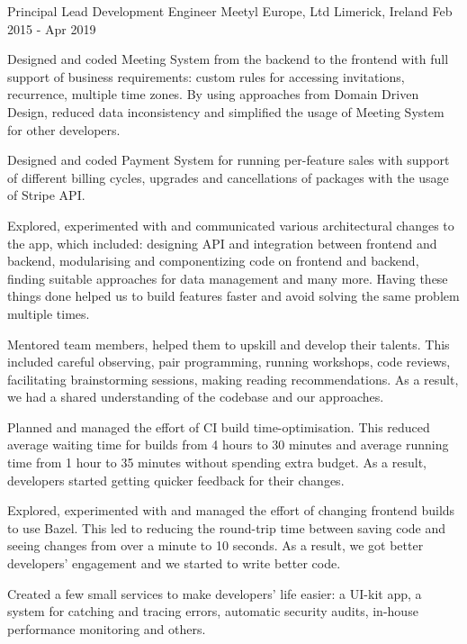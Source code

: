 

\begin{cventries}

  \cventry
    {Principal Lead Development Engineer} %
    {Meetyl Europe, Ltd} %
    {Limerick, Ireland} %
    {Feb 2015 - Apr 2019} %
    {
      \begin{cvitems} %
        \item {Designed and coded Meeting System from the backend to the frontend with full support of business requirements: custom rules for accessing invitations, recurrence, multiple time zones. By using approaches from Domain Driven Design, reduced data inconsistency and simplified the usage of Meeting System for other developers.}
        \item {Designed and coded Payment System for running per-feature sales with support of different billing cycles, upgrades and cancellations of packages with the usage of Stripe API.}
        \item {Explored, experimented with and communicated various architectural changes to the app, which included: designing API and integration between frontend and backend, modularising and componentizing code on frontend and backend, finding suitable approaches for data management and many more. Having these things done helped us to build features faster and avoid solving the same problem multiple times.}
        \item {Mentored team members, helped them to upskill and develop their talents. This included careful observing, pair programming, running workshops, code reviews, facilitating brainstorming sessions, making reading recommendations. As a result, we had a shared understanding of the codebase and our approaches.}
        \item {Planned and managed the effort of CI build time-optimisation. This reduced average waiting time for builds from 4 hours to 30 minutes and average running time from 1 hour to 35 minutes without spending extra budget. As a result, developers started getting quicker feedback for their changes.}
        \item {Explored, experimented with and managed the effort of changing frontend builds to use Bazel. This led to reducing the round-trip time between saving code and seeing changes from over a minute to 10 seconds. As a result, we got better developers’ engagement and we started to write better code.}
        \item {Created a few small services to make developers' life easier: a UI-kit app, a system for catching and tracing errors, automatic security audits, in-house performance monitoring and others.}
      \end{cvitems}
    }


\end{cventries}
